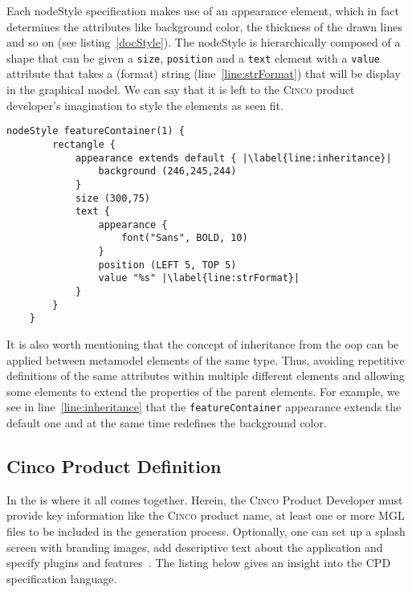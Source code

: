 Each nodeStyle specification makes use of an appearance element, which in fact determines the attributes like background color, the thickness of the drawn lines and so on (see listing~\ref{docStyle}). The nodeStyle is hierarchically composed of a shape that can be given a \lstinline[language=MGL]{size}, \lstinline[language=MGL]{position} and a \lstinline[language=MGL]{text} element with a \lstinline[language=MGL]{value} attribute that takes a (format) string (line~\ref{line:strFormat}) that will be display in the graphical model. We can say that it is left to the \textsc{Cinco} product developer's imagination to style the elements as seen fit.

\begin{lstlisting}[language=MGL, caption={Excerpt from feature.style to be applied to feature.mgl}, label=docStyle, escapechar=|, name=docMSL]
    nodeStyle featureContainer(1) {
        rectangle {
            appearance extends default { |\label{line:inheritance}|
                background (246,245,244)
            }
            size (300,75)
            text {
                appearance {
                    font("Sans", BOLD, 10)
                }
                position (LEFT 5, TOP 5)
                value "%s" |\label{line:strFormat}|
            }
        }
    }
\end{lstlisting}

It is also worth mentioning that the concept of inheritance from the \gls*{oop} can be applied between metamodel elements of the same type. Thus, avoiding repetitive definitions of the same attributes within multiple different elements and allowing some elements to extend the properties of the parent elements. For example, we see in line~\ref{line:inheritance} that the \lstinline{featureContainer} appearance extends the default one and at the same time redefines the background color.

\subsection{Cinco Product Definition}\label{sec:CPD}

In the  is where it all comes together. Herein, the \textsc{Cinco} Product Developer must provide key information like the \textsc{Cinco} product name, at least one or more MGL files to be included in the generation process. Optionally, one can set up a splash screen with branding images, add descriptive text about the application and specify plugins and features~\cite{gitlabcinco}.
The listing below gives an insight into the CPD specification language.


